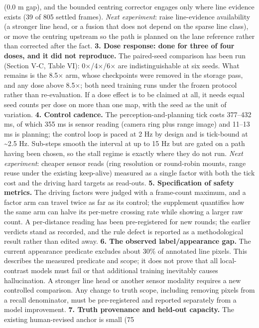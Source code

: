 \documentclass[journal]{IEEEtran}
\begin{document}
(0.0 m gap), and the bounded centring corrector engages only where line evidence exists (39 of
805 settled frames). \emph{Next experiment}: raise line-evidence availability (a stronger line head,
or a fusion that does not depend on the sparse line class), or move the centring upstream so the
path is planned on the lane reference rather than corrected after the fact.
\textbf{3. Dose response: done for three of four doses, and it did not reproduce.} The paired-seed comparison
has been run (Section V-C, Table VI): 0$\times$/4$\times$/6$\times$ are indistinguishable at six seeds. What remains is the
8.5$\times$ arm, whose checkpoints were removed in the storage pass, and any dose above 8.5$\times$; both need training
runs under the frozen protocol rather than re-evaluation. If a dose effect is to be claimed at all, it
needs equal seed counts per dose on more than one map, with the seed as the unit of variation.
\textbf{4. Control cadence.} The perception-and-planning tick costs 377--432 ms, of which 355 ms is
sensor reading (camera ring plus range image) and 11--13 ms is planning; the control loop is paced
at 2 Hz by design and is tick-bound at \textasciitilde{}2.5 Hz. Sub-steps smooth the interval at up to 15 Hz but
are gated on a path having been chosen, so the stall regime is exactly where they do not run.
\emph{Next experiment}: cheaper sensor reads (ring resolution or round-robin mounts, range reuse under
the existing keep-alive) measured as a single factor with both the tick cost and the driving hard
targets as read-outs.
\textbf{5. Specification of safety metrics.} The driving factors were judged with a frame-count
maximum, and a factor arm can travel twice as far as its control; the supplement quantifies
how the same arm can halve its per-metre crossing rate while showing a larger raw count. A
per-distance reading has been pre-registered for new rounds; the earlier verdicts stand as
recorded, and the rule defect is reported as a methodological result rather than edited away.
\textbf{6. The observed label/appearance gap.} The current appearance predicate excludes about 30\% of
annotated line pixels. This describes the measured predicate and scope; it does not prove that
all local-contrast models must fail or that additional training inevitably causes hallucination.
A stronger line head or another sensor modality requires a new controlled comparison. Any change
to truth scope, including removing pixels from a recall denominator, must be pre-registered and
reported separately from a model improvement.
\textbf{7. Truth provenance and held-out capacity.} The existing human-revised anchor is small (75
\end{document}
